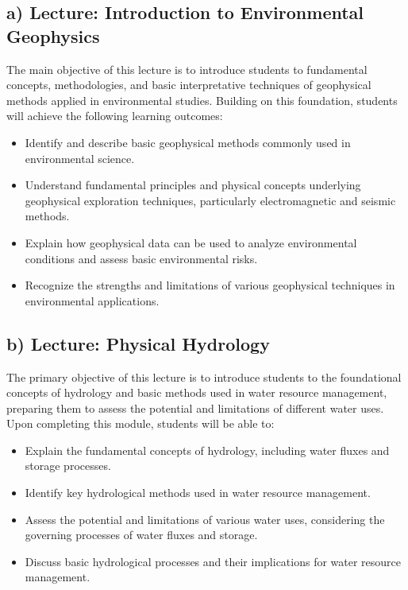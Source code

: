 \documentclass[
  letterpaper,
  10pt,
  openany]{book}
\providecommand{\tightlist}{%
  \setlength{\itemsep}{0pt}\setlength{\parskip}{0pt}}\usepackage{longtable,booktabs,array}
\begin{document}

\subsection*{a) Lecture: Introduction to Environmental
Geophysics}\label{a-lecture-introduction-to-environmental-geophysics}

The main objective of this lecture is to introduce students to
fundamental concepts, methodologies, and basic interpretative techniques
of geophysical methods applied in environmental studies. Building on
this foundation, students will achieve the following learning outcomes:

\begin{itemize}
\tightlist
\item
  Identify and describe basic geophysical methods commonly used in
  environmental science.
\item
  Understand fundamental principles and physical concepts underlying
  geophysical exploration techniques, particularly electromagnetic and
  seismic methods.
\item
  Explain how geophysical data can be used to analyze environmental
  conditions and assess basic environmental risks.
\item
  Recognize the strengths and limitations of various geophysical
  techniques in environmental applications.
\end{itemize}

\subsection*{b) Lecture: Physical
Hydrology}\label{b-lecture-physical-hydrology}

The primary objective of this lecture is to introduce students to the
foundational concepts of hydrology and basic methods used in water
resource management, preparing them to assess the potential and
limitations of different water uses. Upon completing this module,
students will be able to:

\begin{itemize}
\tightlist
\item
  Explain the fundamental concepts of hydrology, including water fluxes
  and storage processes.
\item
  Identify key hydrological methods used in water resource management.
\item
  Assess the potential and limitations of various water uses,
  considering the governing processes of water fluxes and storage.
\item
  Discuss basic hydrological processes and their implications for water
  resource management.
\end{itemize}
\end{document}
